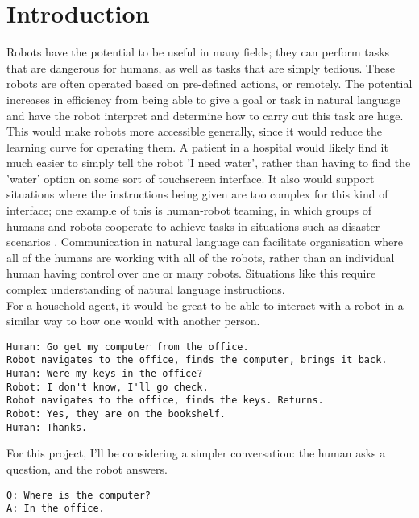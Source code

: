 \chapter{Introduction}
Robots have the potential to be useful in many fields; they can perform tasks that are dangerous for humans, as well as tasks that are simply tedious. These robots are often operated based on pre-defined actions, or remotely. The potential increases in efficiency from being able to give a goal or task in natural language and have the robot interpret and determine how to carry out this task are huge. This would make robots more accessible generally, since it would reduce the learning curve for operating them. A patient in a hospital would likely find it much easier to simply tell the robot 'I need water', rather than having to find the 'water' option on some sort of touchscreen interface. It also would support situations where the instructions being given are too complex for this kind of interface; one example of this is human-robot teaming, in which groups of humans and robots cooperate to achieve tasks in situations such as disaster scenarios \cite{Kruijff-Korbayova:2015aa}. Communication in natural language can facilitate organisation where all of the humans are working with all of the robots, rather than an individual human having control over one or many robots. Situations like this require complex understanding of natural language instructions. \\
For a household agent, it would be great to be able to interact with a robot in a similar way to how one would with another person. 
\begin{verbatim}
Human: Go get my computer from the office. 
Robot navigates to the office, finds the computer, brings it back. 
Human: Were my keys in the office?
Robot: I don't know, I'll go check. 
Robot navigates to the office, finds the keys. Returns.
Robot: Yes, they are on the bookshelf. 
Human: Thanks. 
\end{verbatim}
For this project, I'll be considering a simpler conversation: the human asks a question, and the robot answers. %
\begin{verbatim}
Q: Where is the computer?
A: In the office. 
\end{verbatim}

